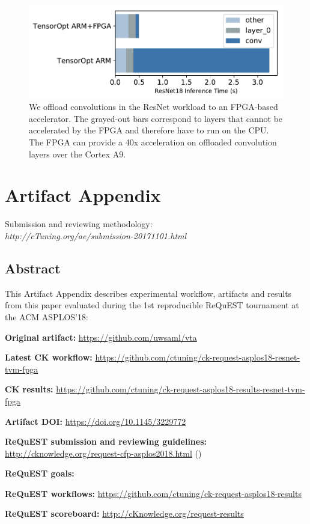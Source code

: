 \documentclass[sigconf]{acmart}
\newenvironment{packed_itemize}{
\begin{itemize}
  \setlength{\itemsep}{1pt}
  \setlength{\parskip}{0pt}
  \setlength{\parsep}{0pt}
}{\end{itemize}}
\begin{document}
\begin{figure}[t]
\centering
\includegraphics[width=1\columnwidth]{figures/exp_fpga_e2e}
\caption{\small{We offload convolutions in the ResNet workload to an FPGA-based accelerator.
The grayed-out bars correspond to layers that cannot be accelerated by the FPGA and therefore have to run on the CPU. The FPGA can provide a 40x acceleration on offloaded convolution layers over the Cortex A9.}}
\label{fig:e2e_fpga}
\end{figure}




\newpage

\onecolumn

\appendix
\section{Artifact Appendix}

Submission and reviewing methodology: \\
{\em http://cTuning.org/ae/submission-20171101.html}

\subsection{Abstract}

This Artifact Appendix describes experimental workflow,
artifacts and results from this paper evaluated 
during the 1st reproducible ReQuEST tournament at the ACM ASPLOS'18:

\begin{packed_itemize}
  \item {\bf Original artifact:} \url{https://github.com/uwsaml/vta}
  \item {\bf Latest CK workflow:} \url{https://github.com/ctuning/ck-request-asplos18-resnet-tvm-fpga}
  \item {\bf CK results:} \url{https://github.com/ctuning/ck-request-asplos18-results-resnet-tvm-fpga}
  \item {\bf Artifact DOI:} \url{https://doi.org/10.1145/3229772}
  \item {\bf ReQuEST submission and reviewing guidelines:} \url{http://cknowledge.org/request-cfp-asplos2018.html} (\cite{request-asplos18})
  \item {\bf ReQuEST goals:} \cite{cm:29db2248aba45e59:0c7348dfbadd5b95}
  \item {\bf ReQuEST workflows:} \url{https://github.com/ctuning/ck-request-asplos18-results}
  \item {\bf ReQuEST scoreboard:} \url{http://cKnowledge.org/request-results}
\end{packed_itemize}
\end{document}
